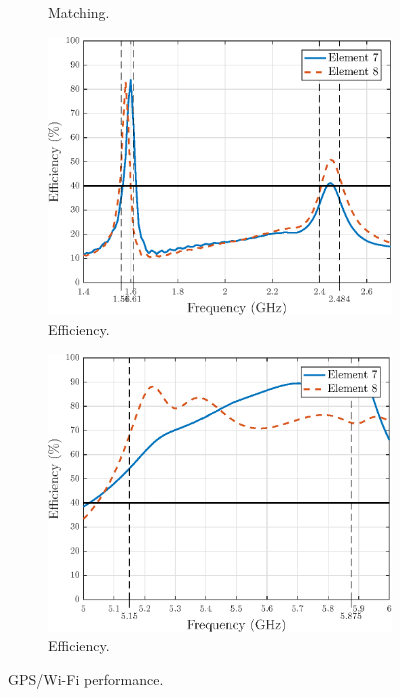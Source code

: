 \begin{figure}[H]
\begin{subfigure}[b]{0.49\textwidth}
        \caption{Matching.}
        \label{fig:wifihi_match}
    \end{subfigure}
    
    \begin{subfigure}[b]{0.49\textwidth}
        \includegraphics[width=\textwidth]{img/wifilow_eff_wgps.eps}
        \caption{Efficiency.}
        \label{fig:wifilow_eff}
    \end{subfigure}
    \begin{subfigure}[b]{0.49\textwidth}
        \includegraphics[width=\textwidth]{img/wifihi_eff_wgps.eps}
        \caption{Efficiency.}
        \label{fig:wifihi_eff}
    \end{subfigure}
    \caption{GPS/Wi-Fi performance.}
    \label{fig:gpswifi_perf}
\end{figure}


